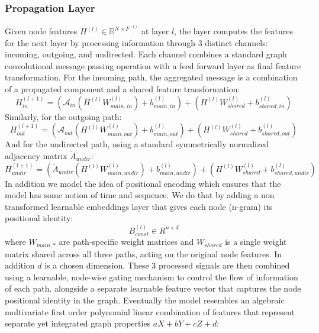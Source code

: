 \documentclass[utf8]{FrontiersinHarvard}
\begin{document}
	\subsubsection{Propagation Layer}
	Given node features $H^{(l)} \in \mathbb{R}^{N \times F^{(l)}}$ at layer $l$, the layer computes the features for the next layer by processing information through 3 distinct channels: incoming, outgoing, and undirected. Each channel combines a standard graph convolutional message passing operation with a feed forward layer as final feature transformation.
	For the incoming path, the aggregated message is a combination of a propagated component and a shared feature transformation:
	\begin{equation}
		H_{in}^{(l+1)} = \left( \mathcal{A}_{in} (H^{(l)} W_{main,in}^{(l)}) + b_{main,in}^{(l)} \right) + \left( H^{(l)} W_{shared}^{(l)} + b_{shared,in}^{(l)} \right)
	\end{equation}
	Similarly, for the outgoing path:
	\begin{equation}
		H_{out}^{(l+1)} = \left( \mathcal{A}_{out} (H^{(l)} W_{main,out}^{(l)}) + b_{main,out}^{(l)} \right) + \left( H^{(l)} W_{shared}^{(l)} + b_{shared,out}^{(l)} \right)
	\end{equation}
	And for the undirected path, using a standard symmetrically normalized adjacency matrix $\tilde{A}_{undir}$:
	\begin{equation}
		H_{undir}^{(l+1)} = \left( \tilde{A}_{undir} (H^{(l)} W_{main,undir}^{(l)}) + b_{main,undir}^{(l)} \right) + \left( H^{(l)} W_{shared}^{(l)} + b_{shared,undir}^{(l)} \right)
	\end{equation}
	In addition we model the idea of positional encoding which ensures that the model has some notion of time and sequence. We do that by adding a non transformed learnable embeddings layer that gives each node (n-gram) its positional identity:
	\begin{equation}
		B_{const}^{(l)} \in R^{n \times d}
	\end{equation}
	where $W_{main,*}$ are path-specific weight matrices and $W_{shared}$ is a single weight matrix shared across all three paths, acting on the original node features. In addition $d$ is a chosen dimension. These 3 processed signals are then combined using a learnable, node-wise gating mechanism to control the flow of information of each path. alongside a separate learnable feature vector that captures the node positional identity in the graph. Eventually the model resembles an algebraic multivariate first order polynomial linear combination of features that represent separate yet integrated graph properties $aX + bY + cZ + d$:
\end{document}
